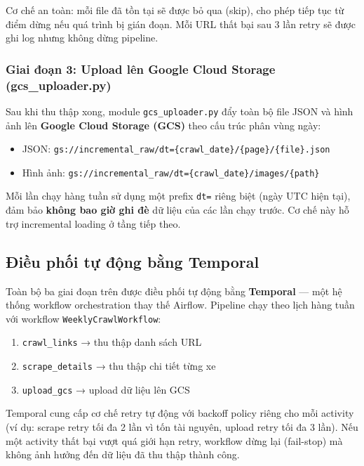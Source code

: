 Cơ chế an toàn: mỗi file đã tồn tại sẽ được bỏ qua (skip), cho phép tiếp tục từ điểm dừng nếu quá trình bị gián đoạn. Mỗi URL thất bại sau 3 lần retry sẽ được ghi log nhưng không dừng pipeline.

\subsubsection{Giai đoạn 3: Upload lên Google Cloud Storage (gcs\_uploader.py)}

Sau khi thu thập xong, module \texttt{gcs\_uploader.py} đẩy toàn bộ file JSON và hình ảnh lên \textbf{Google Cloud Storage (GCS)} theo cấu trúc phân vùng ngày:

\begin{itemize}
    \item JSON: \texttt{gs://incremental\_raw/dt=\{crawl\_date\}/\{page\}/\{file\}.json}
    \item Hình ảnh: \texttt{gs://incremental\_raw/dt=\{crawl\_date\}/images/\{path\}}
\end{itemize}

Mỗi lần chạy hàng tuần sử dụng một prefix \texttt{dt=} riêng biệt (ngày UTC hiện tại), đảm bảo \textbf{không bao giờ ghi đè} dữ liệu của các lần chạy trước. Cơ chế này hỗ trợ incremental loading ở tầng tiếp theo.

\subsection{Điều phối tự động bằng Temporal}

Toàn bộ ba giai đoạn trên được điều phối tự động bằng \textbf{Temporal} — một hệ thống workflow orchestration thay thế Airflow. Pipeline chạy theo lịch hàng tuần với workflow \texttt{WeeklyCrawlWorkflow}:

\begin{enumerate}
    \item \texttt{crawl\_links} → thu thập danh sách URL
    \item \texttt{scrape\_details} → thu thập chi tiết từng xe
    \item \texttt{upload\_gcs} → upload dữ liệu lên GCS
\end{enumerate}

Temporal cung cấp cơ chế retry tự động với backoff policy riêng cho mỗi activity (ví dụ: scrape retry tối đa 2 lần vì tốn tài nguyên, upload retry tối đa 3 lần). Nếu một activity thất bại vượt quá giới hạn retry, workflow dừng lại (fail-stop) mà không ảnh hưởng đến dữ liệu đã thu thập thành công.

